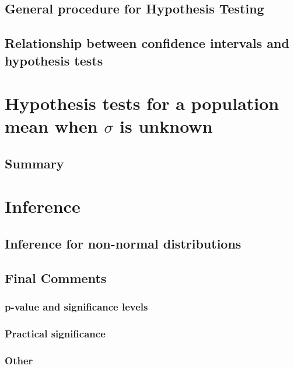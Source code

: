     \subsection{General procedure for Hypothesis Testing}  %
    \subsection{Relationship between confidence intervals and hypothesis tests}  %

\section{Hypothesis tests for a population mean when $\sigma$ is unknown}  %
    \subsection{Summary}  %

\section{Inference}  %
    \subsection{Inference for non-normal distributions}  %
    \subsection{Final Comments}  %
        \subsubsection{p-value and significance levels}  %
        \subsubsection{Practical significance}  %
        \subsubsection{Other}  %
